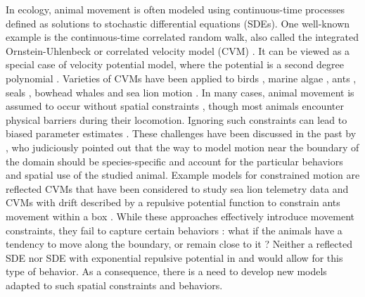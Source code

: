 \documentclass[aoas]{imsart}
\theoremstyle{definition}
\theoremstyle{remark}
\theoremstyle{remark}
\newcommand {\1}{\mathbb{1}}
\begin{document}
In ecology, animal movement is often modeled using continuous-time processes defined as solutions to stochastic differential equations (SDEs). One well-known example is the continuous-time correlated random walk, also called the integrated Ornstein-Uhlenbeck or correlated velocity model (CVM) \citep{johnson_continuous_2008}. It can be viewed as a special case of velocity potential model, where the potential is a second degree polynomial \citep{preisler_analyzing_2013}.  Varieties of CVMs have been applied to birds \citep{janaswamy_state_2018}, marine algae \citep{gurarie_estimating_2011}, ants \citep{russell_spatially_2018}, seals \citep{johnson_continuous_2008,albertsen_generalizing_2018}, bowhead whales \citep{gurarie_correlated_2017} and sea lion motion \citep{hanks_reflected_2017}.
In many cases, animal movement is assumed to occur without spatial constraints \citep{johnson_continuous_2008,michelot_varying-coefficient_2021,gurarie_correlated_2017}, though most animals encounter physical barriers during their locomotion. Ignoring such constraints can lead to biased parameter estimates \citep{hanks_reflected_2017}. These challenges have been discussed in the past by \cite{brillinger_simulating_2003}, who judiciously pointed out that the way to model motion near the boundary of the domain should be species-specific and account for the particular behaviors and spatial use of the studied animal. 
Example models for constrained motion are reflected CVMs that have been considered to study sea lion telemetry data \citep{hanks_reflected_2017} and CVMs with drift described by a repulsive potential function to constrain ants movement within a box \citep{russell_spatially_2018}. While these approaches effectively introduce movement constraints, they fail to capture certain behaviors : what if the animals have a tendency to move along the boundary, or remain close to it ? 
Neither a reflected SDE nor SDE with exponential repulsive potential in \cite{hanks_reflected_2017} and \cite{russell_spatially_2018} would allow for this type of behavior. As a consequence, there is a need to develop new models adapted to such spatial constraints and behaviors.\\
\end{document}
